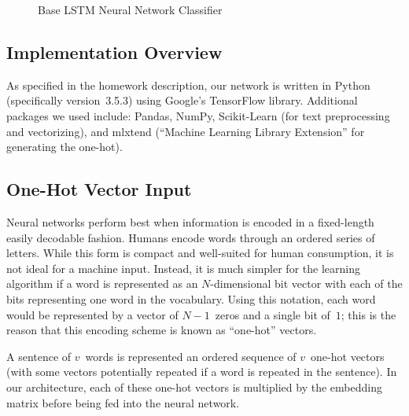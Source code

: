 \documentclass{report}
\begin{document}
\begin{figure}
    \caption{Base LSTM Neural Network Classifier}\label{fig:completeLstmClassifer}
  \end{figure}
  
  
  
  \subsection{Implementation Overview}\label{sec:implementation}
  
  As specified in the homework description, our network is written in Python (specifically version~3.5.3) using Google's TensorFlow library.  Additional packages we used include: Pandas, NumPy, Scikit-Learn (for text preprocessing and vectorizing), and mlxtend (``Machine Learning Library Extension'' for generating the one-hot). 
  
  \subsection{One-Hot Vector Input}\label{sec:oneHotVector}
  
  Neural networks perform best when information is encoded in a fixed-length easily decodable fashion.  Humans encode words through an ordered series of letters.  While this form is compact and well-suited for human consumption, it is not ideal for a machine input.  Instead, it is much simpler for the learning algorithm if a word is represented as an $N$-dimensional bit vector with each of the bits representing one word in the vocabulary.  Using this notation, each word would be represented by a vector of $N-1$~zeros and a single bit of~$1$; this is the reason that this encoding scheme is known as ``one-hot'' vectors.  
  
  A sentence of $v$~words is represented an ordered sequence of $v$~one-hot vectors (with some vectors potentially repeated if a word is repeated in the sentence).  In our architecture, each of these one-hot vectors is multiplied by the embedding matrix before being fed into the neural network.
  
\end{document}
